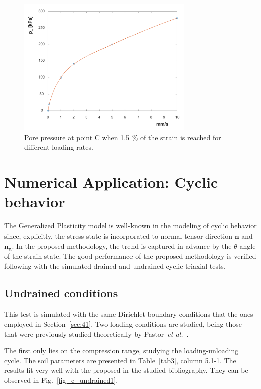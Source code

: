 \documentclass[preprint,12pt,a4paper]{elsarticle}
\begin{document}
\begin{figure}
\centering
\includegraphics[width=0.75\textwidth]{Figs/excess_porepressure.pdf}
\caption{Pore pressure at point C when 1.5 \% of the strain is reached for different loading rates.}
\label{fig_pw}
\end{figure}

\section{Numerical Application: Cyclic behavior}
\label{sec:5}
The Generalized Plasticity model is well-known in the modeling of cyclic behavior since, explicitly, the stress state is incorporated to  normal tensor direction $ \boldsymbol{n}$ and $ \boldsymbol{n_g}$. In the proposed methodology, the trend is captured in advance by the $\theta$ angle of the strain state. The good performance of the proposed methodology is verified following with the simulated drained and undrained cyclic triaxial tests.

\subsection{Undrained conditions}
\label{subsec:51}
This test is simulated with the same Dirichlet boundary conditions that the ones employed in Section~\ref{sec:41}. Two loading conditions are studied, being those that were previously studied theoretically by Pastor~\textit{et al.}~\cite{PastorZC:90}. 

The first only lies on the compression range, studying the loading-unloading cycle. The soil parameters are presented in Table~\ref{tab3}, column 5.1-1. The results fit very well with the proposed in the studied bibliography. They can be observed in Fig.~\ref{fig_c_undrained1}.
\end{document}
